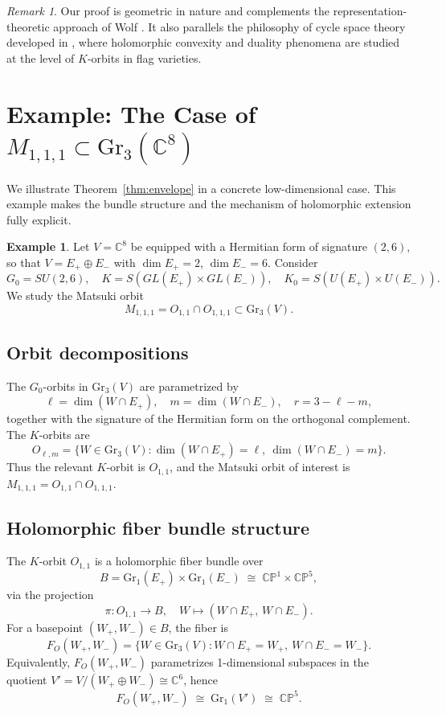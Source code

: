 \documentclass[12pt,a4paper]{article}
\theoremstyle{plain}
\theoremstyle{definition}
\newtheorem{example}{Example}%
\theoremstyle{remark}
\newtheorem*{remark}{Remark}
\begin{document}
\begin{remark}
Our proof is geometric in nature and complements the representation-theoretic 
approach of Wolf \cite{Wolf1989,Wolf1969}. 
It also parallels the philosophy of cycle space theory developed in 
\cite{FelsHuckleberryWolf2006}, where holomorphic convexity and duality phenomena are studied 
at the level of $K$-orbits in flag varieties. 
\end{remark}

\section{Example: The Case of $M_{1,1,1} \subset \mathrm{Gr}_3(\mathbb{C}^8)$}

We illustrate Theorem~\ref{thm:envelope} in a concrete low-dimensional case. 
This example makes the bundle structure and the mechanism of holomorphic 
extension fully explicit. 

\begin{example}
Let $V = \mathbb{C}^8$ be equipped with a Hermitian form of signature $(2,6)$, 
so that $V = E_+ \oplus E_-$ with $\dim E_+ = 2$, $\dim E_- = 6$. 
Consider
\[
G_0 = SU(2,6), 
\quad 
K = S(GL(E_+) \times GL(E_-)), 
\quad 
K_0 = S(U(E_+) \times U(E_-)).
\]
We study the Matsuki orbit
\[
M_{1,1,1} = O_{1,1} \cap O_{1,1,1} \subset \mathrm{Gr}_3(V).
\]
\end{example}

\subsection{Orbit decompositions}
The $G_0$-orbits in $\mathrm{Gr}_3(V)$ are parametrized by 
\[
\ell = \dim(W \cap E_+), \quad 
m = \dim(W \cap E_-), \quad 
r = 3-\ell-m,
\]
together with the signature of the Hermitian form on the orthogonal complement. 
The $K$-orbits are
\[
O_{\ell,m} = \{ W \in \mathrm{Gr}_3(V) : 
\dim(W \cap E_+) = \ell, \ \dim(W \cap E_-) = m \}.
\]
Thus the relevant $K$-orbit is $O_{1,1}$, and the Matsuki orbit of interest 
is $M_{1,1,1} = O_{1,1} \cap O_{1,1,1}$.

\subsection{Holomorphic fiber bundle structure}
The $K$-orbit $O_{1,1}$ is a holomorphic fiber bundle over
\[
B = \mathrm{Gr}_1(E_+) \times \mathrm{Gr}_1(E_-) 
\;\cong\; \mathbb{C}\mathbb{P}^1 \times \mathbb{C}\mathbb{P}^5,
\]
via the projection
\[
\pi : O_{1,1} \to B, 
\quad W \mapsto (W \cap E_+, \, W \cap E_-).
\]
For a basepoint $(W_+,W_-) \in B$, the fiber is
\[
F_O(W_+,W_-) = \{ W \in \mathrm{Gr}_3(V) : 
W \cap E_+ = W_+, \ W \cap E_- = W_- \}.
\]
Equivalently, $F_O(W_+,W_-)$ parametrizes 1-dimensional subspaces 
in the quotient $V' = V/(W_+ \oplus W_-) \cong \mathbb{C}^6$, hence
\[
F_O(W_+,W_-) \;\cong\; \mathrm{Gr}_1(V') \;\cong\; \mathbb{C}\mathbb{P}^5.
\]
\end{document}
